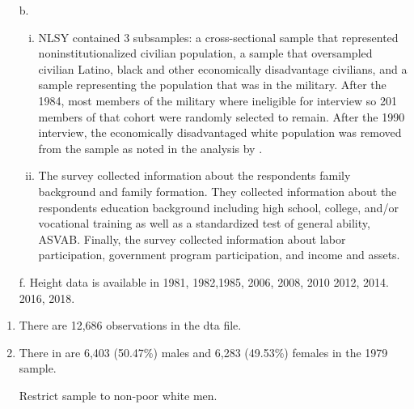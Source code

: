 \documentclass[12pt]{article}
\begin{document}
    \begin{enumerate}[\indent a.]
        \item[b.]
            \begin{enumerate}[(i)]
                \item NLSY contained 3 subsamples: a cross-sectional sample that 
                represented noninstitutionalized civilian population, a 
                sample that oversampled civilian Latino, black and other 
                economically disadvantage civilians, and a sample representing 
                the population that was in the military.  After the 1984, most 
                members of the military where ineligible for interview so 201 
                members of that cohort were randomly selected to remain. After 
                the 1990 interview, the economically disadvantaged white 
                population was removed from the sample as noted in the analysis 
                by \textcite{Persico2004}.

                \item The survey collected information about the respondents 
                family background and family formation. They collected 
                information about the respondents education background including 
                high school, college, and/or vocational training as well as a 
                standardized test of general ability, ASVAB. Finally, the survey 
                collected information about labor participation, government 
                program participation, and income and assets.
            \end{enumerate}
        \item[f.] Height data is available in 1981, 1982,1985, 2006, 2008, 2010 
        2012, 2014. 2016, 2018.
    \end{enumerate}

    \begin{enumerate}[\indent a.]
        \item There are 12,686 observations in the dta file.

        \item There in are 6,403 (50.47\%) males and 6,283 (49.53\%) females in 
        the 1979 sample.
    \end{enumerate}

\begin{itemize}
    \item[] Restrict sample to non-poor white men.
\end{itemize}
\end{document}
